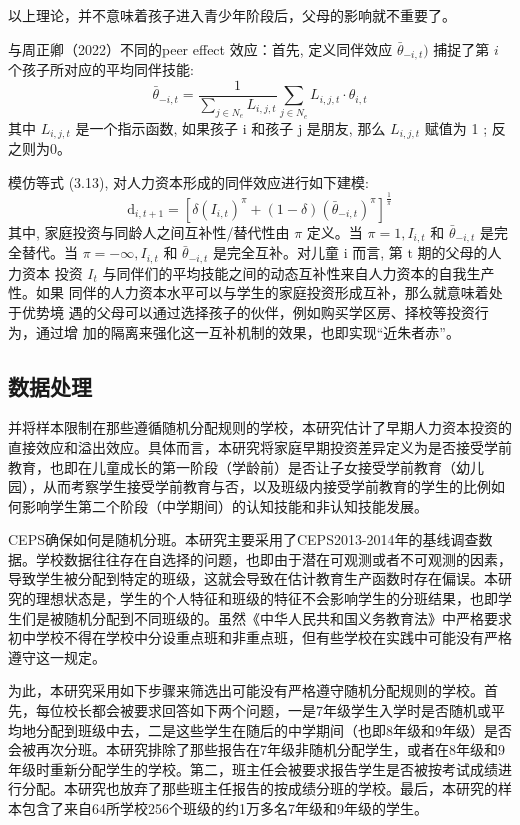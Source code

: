 以上理论，并不意味着孩子进入青少年阶段后，父母的影响就不重要了。

与周正卿（2022）不同的peer effect 效应：首先, 定义同伴效应 
$\bar{\theta}_{-i, t})$ 捕捉了第 $i$ 个孩子所对应的平均同伴技能:
$$
\bar{\theta}_{-i, t}=\frac{1}{\sum_{j \in N_e} L_{i, j, t}} \sum_{j \in N_e} L_{i, j, t} \cdot \theta_{i, t}
$$
其中 $L_{i, j, t}$ 是一个指示函数, 如果孩子 $\mathrm{i}$ 和孩子 $\mathrm{j}$ 是朋友, 那么 $L_{i, j, t}$ 赋值为 1 ; 反之则为0。

模仿等式 (3.13), 对人力资本形成的同伴效应进行如下建模:
$$
\mathrm{d}_{i, t+1}=\left[\delta\left(I_{i, t}\right)^\pi+(1-\delta)\left(\bar{\theta}_{-i, t}\right)^\pi\right]^{\frac{1}{\pi}}
$$
其中, 家庭投资与同龄人之间互补性/替代性由 $\pi$ 定义。当 $\pi=1, I_{i, t}$ 和 $\bar{\theta}_{-i, t}$ 是完
全替代。当 $\pi=-\infty, I_{i, t}$ 和 $\bar{\theta}_{-i, t}$ 是完全互补。对儿童 $\mathrm{i}$ 而言, 第 $\mathrm{t}$ 期的父母的人力资本 投资 $I_t$ 与同伴们的平均技能之间的动态互补性来自人力资本的自我生产性。如果 同伴的人力资本水平可以与学生的家庭投资形成互补，那么就意味着处于优势境 遇的父母可以通过选择孩子的伙伴，例如购买学区房、择校等投资行为，通过增 加的隔离来强化这一互补机制的效果，也即实现“近朱者赤”。

\subsection{数据处理}

并将样本限制在那些遵循随机分配规则的学校，本研究估计了早期人力资本投资的直接效应和溢出效应。具体而言，本研究将家庭早期投资差异定义为是否接受学前教育，也即在儿童成长的第一阶段（学龄前）是否让子女接受学前教育（幼儿园），从而考察学生接受学前教育与否，以及班级内接受学前教育的学生的比例如何影响学生第二个阶段（中学期间）的认知技能和非认知技能发展。


CEPS确保如何是随机分班。本研究主要采用了CEPS2013-2014年的基线调查数据。学校数据往往存在自选择的问题，也即由于潜在可观测或者不可观测的因素，导致学生被分配到特定的班级，这就会导致在估计教育生产函数时存在偏误。本研究的理想状态是，学生的个人特征和班级的特征不会影响学生的分班结果，也即学生们是被随机分配到不同班级的。虽然《中华人民共和国义务教育法》中严格要求初中学校不得在学校中分设重点班和非重点班，但有些学校在实践中可能没有严格遵守这一规定。

为此，本研究采用如下步骤来筛选出可能没有严格遵守随机分配规则的学校。首先，每位校长都会被要求回答如下两个问题，一是7年级学生入学时是否随机或平均地分配到班级中去，二是这些学生在随后的中学期间（也即8年级和9年级）是否会被再次分班。本研究排除了那些报告在7年级非随机分配学生，或者在8年级和9年级时重新分配学生的学校。第二，班主任会被要求报告学生是否被按考试成绩进行分配。本研究也放弃了那些班主任报告的按成绩分班的学校。最后，本研究的样本包含了来自64所学校256个班级的约1万多名7年级和9年级的学生。

